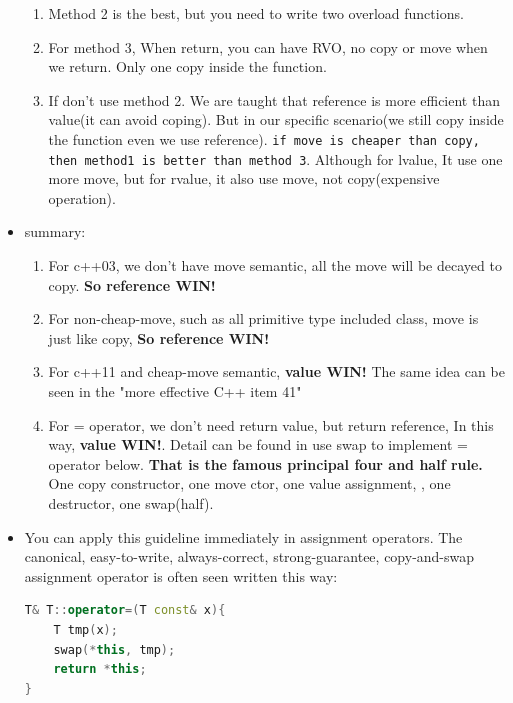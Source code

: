 \documentclass[a4paper,11pt,twoside]{book}
\begin{document}
\begin{itemize}
\begin{enumerate}
	\item Method 2 is the best, but you need to write two overload functions.
	
	\item For method 3, When return, you can have RVO, no copy or move when we return. Only one copy inside the function.
	
	\item If don’t use method 2.  We are taught that reference is more efficient than value(it can avoid coping). But in our specific scenario(we still copy inside the function even we use reference). \texttt{if move is cheaper than copy, then method1 is better than method 3}. Although for lvalue, It use one more move, but for rvalue, it also use move, not copy(expensive operation).
	  
\end{enumerate}


\item summary:
\begin{enumerate}
	\item For c++03, we don't have move semantic, all the move will be decayed to copy. \textbf{So reference WIN!}
	
	\item For non-cheap-move, such as all primitive type included class, move is just like copy, \textbf{So reference WIN!}
	
	\item For c++11 and cheap-move semantic, \textbf{value WIN!} The same idea can be seen in the "more effective C++ item 41" 
	
	\item For = operator, we don't need return value, but return reference, In this way, \textbf{value WIN!}. Detail can be found in use swap to implement = operator below. \textbf{That is the famous principal four and half rule.} One copy constructor, one move ctor, one value assignment, , one destructor, one swap(half).
	
\end{enumerate}

\item You can apply this guideline immediately in assignment operators. The canonical, easy-to-write, always-correct, strong-guarantee, copy-and-swap assignment operator is often seen written this way:
\begin{lstlisting}[frame=single, language=c++]
T& T::operator=(T const& x){ 
	T tmp(x);          
	swap(*this, tmp);  
	return *this;      
}


\end{lstlisting}
\end{itemize}
\end{document}
